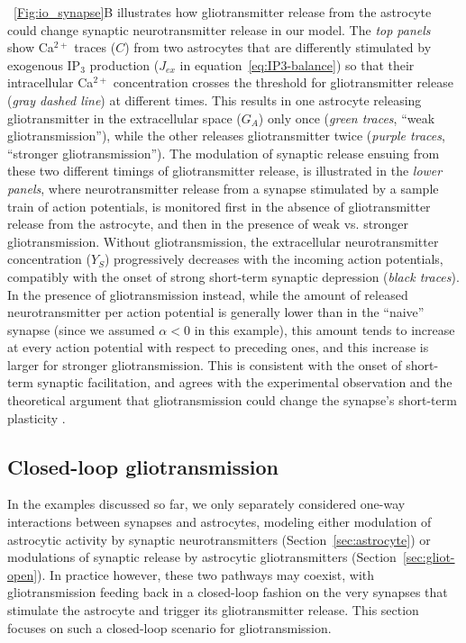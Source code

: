 \documentclass[a4paper, 11pt]{article}
\newcommand*{\figref}[1]{\figurename~\ref{#1}}
\newcommand*{\secref}[1]{Section~\ref{#1}}
\renewcommand*{\eqref}[1]{equation~\ref{#1}}
\begin{document}
\figref{Fig:io_synapse}B illustrates how gliotransmitter release from the astrocyte could change synaptic neurotransmitter release in our model.
The \textit{top panels} show Ca$^{2+}$ traces ($C$) from two astrocytes that are differently stimulated by exogenous IP$_3$ production ($J_{ex}$ in \eqref{eq:IP3-balance}) so that their intracellular Ca$^{2+}$ concentration crosses the threshold for gliotransmitter release (\textit{gray dashed line}) at different times.
This results in one astrocyte releasing gliotransmitter in the extracellular space ($G_A$) only once (\textit{green traces}, ``weak gliotransmission''), while the other releases gliotransmitter twice (\textit{purple traces}, ``stronger gliotransmission'').
The modulation of synaptic release ensuing from these two different timings of gliotransmitter release, is illustrated in the \textit{lower panels}, where neurotransmitter release from a synapse stimulated by a sample train of action potentials, is monitored first in the absence of gliotransmitter release from the astrocyte, and then in the presence of weak vs. stronger gliotransmission.
Without gliotransmission, the extracellular neurotransmitter concentration ($Y_S$) progressively decreases with the incoming action potentials, compatibly with the onset of strong short-term synaptic depression (\textit{black traces}).
In the presence of gliotransmission instead, while the amount of released neurotransmitter per action potential is generally lower than in the ``naive'' synapse (since we assumed $\alpha < 0$ in this example), this amount tends to increase at every action potential with respect to preceding ones, and this increase is larger for stronger gliotransmission.
This is consistent with the onset of short-term synaptic facilitation, and agrees with the experimental observation and the theoretical argument that gliotransmission could change the synapse's short-term plasticity \citep[see also \textcolor{red}{Chapters~8} and~\textcolor{red}{13}]{Araque_Neuron2014,DePitta_Neurosci2015}.

\subsection{Closed-loop gliotransmission}\label{sec:gliot-closed}
In the examples discussed so far, we only separately considered one-way interactions between synapses and astrocytes, modeling either modulation of astrocytic activity by synaptic neurotransmitters (\secref{sec:astrocyte}) or modulations of synaptic release by astrocytic gliotransmitters (\secref{sec:gliot-open}).
In practice however, these two pathways may coexist, with gliotransmission feeding back in a closed-loop fashion on the very synapses that stimulate the astrocyte and trigger its gliotransmitter release.
This section focuses on such a closed-loop scenario for gliotransmission. 
\end{document}
